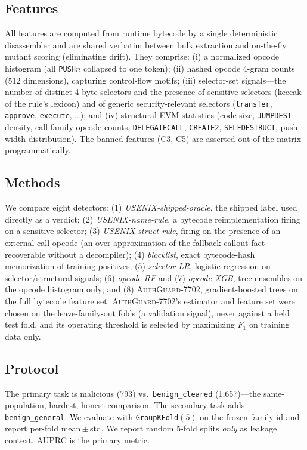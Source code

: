\documentclass[conference]{IEEEtran}
\newcommand{\tool}{\textsc{AuthGuard-7702}}
\newcommand{\code}[1]{\texttt{#1}}
\begin{document}
\subsection{Features}
All features are computed from runtime bytecode by a single deterministic disassembler and
are shared verbatim between bulk extraction and on-the-fly mutant scoring (eliminating drift).
They comprise: (i) a normalized opcode histogram (all \code{PUSH$n$} collapsed to one token);
(ii) hashed opcode 4-gram counts (512 dimensions), capturing control-flow motifs; (iii)
selector-set signals---the number of distinct 4-byte selectors and the presence of sensitive
selectors (keccak of the rule's lexicon) and of generic security-relevant selectors
(\code{transfer}, \code{approve}, \code{execute}, \dots); and (iv) structural EVM statistics
(code size, \code{JUMPDEST} density, call-family opcode counts, \code{DELEGATECALL},
\code{CREATE2}, \code{SELFDESTRUCT}, push-width distribution). The banned features (C3, C5)
are asserted out of the matrix programmatically.

\subsection{Methods}
We compare eight detectors: (1) \emph{USENIX-shipped-oracle}, the shipped label used directly
as a verdict; (2) \emph{USENIX-name-rule}, a bytecode reimplementation firing on a sensitive
selector; (3) \emph{USENIX-struct-rule}, firing on the presence of an external-call opcode
(an over-approximation of the fallback-callout fact recoverable without a decompiler); (4)
\emph{blocklist}, exact bytecode-hash memorization of training positives; (5)
\emph{selector-LR}, logistic regression on selector/structural signals; (6) \emph{opcode-RF}
and (7) \emph{opcode-XGB}, tree ensembles on the opcode histogram only; and (8) \tool{},
gradient-boosted trees on the full bytecode feature set. \tool{}'s estimator and feature set
were chosen on the leave-family-out folds (a validation signal), never against a held test
fold, and its operating threshold is selected by maximizing $F_1$ on training data only.

\subsection{Protocol}
The primary task is malicious (793) vs.\ \code{benign\_cleared} (1{,}657)---the same-population,
hardest, honest comparison. The secondary task adds \code{benign\_general}. We evaluate with
\code{GroupKFold}$(5)$ on the frozen family id and report per-fold mean\,$\pm$\,std. We report
random $5$-fold splits \emph{only} as leakage context. AUPRC is the primary metric.
\end{document}
